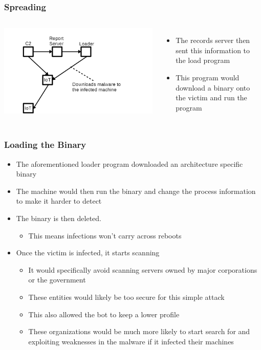 \documentclass{beamer}
\begin{document}
\begin{frame}
	\frametitle{Spreading}
	\begin{columns}
			\includegraphics[width=\textwidth]{fig3.png}
			\begin{itemize}
				\item<+-> The records server then sent this information to the load program
				\item<+-> This program would download a binary onto the victim and run the program
			\end{itemize}
	\end{columns}
\end{frame}

\begin{frame}
	\frametitle{Loading the Binary}
	\begin{itemize}
		\item<+-> The aforementioned loader program downloaded an architecture specific binary
		\item<+-> The machine would then run the binary and change the process information to make it harder to detect
		\item<+-> The binary is then deleted.
		\begin{itemize}
			\item<+-> This means infections won't carry across reboots
		\end{itemize}
		\item<+-> Once the victim is infected, it starts scanning
		\begin{itemize}
			\item<+-> It would specifically avoid scanning servers owned by major corporations or the government
			\item<+-> These entities would likely be too secure for this simple attack
			\item<+-> This also allowed the bot to keep a lower profile
			\item<+-> These organizations would be much more likely to start search for and exploiting weaknesses in the malware if it infected their machines
		\end{itemize}
	\end{itemize}
\end{frame}
\end{document}
